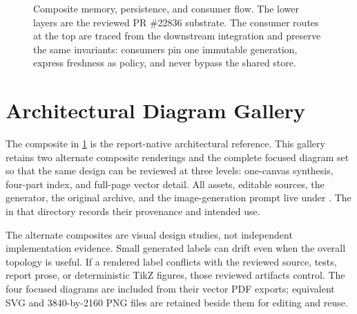 \documentclass[11pt]{article}
\newcommand{\code}[1]{\texttt{\detokenize{#1}}}
\begin{document}
\begin{landscape}
\begin{figure}[p]
{}
\caption{Composite memory, persistence, and consumer flow. The lower layers are the reviewed PR \#22836 substrate. The consumer routes at the top are traced from the downstream \code{dev/refactor} integration and preserve the same invariants: consumers pin one immutable generation, express freshness as policy, and never bypass the shared store.}
\label{fig:cache-composite}
\end{figure}
\end{landscape}
\clearpage

\section{Architectural Diagram Gallery}

The composite in \cref{fig:cache-composite} is the report-native architectural reference. This gallery retains two alternate composite renderings and the complete focused diagram set so that the same design can be reviewed at three levels: one-canvas synthesis, four-part index, and full-page vector detail. All assets, editable sources, the generator, the original archive, and the image-generation prompt live under \code{figures/metadata_cache/}. The \code{README.md} in that directory records their provenance and intended use.

\begin{evidencebox}[title={Rendering and evidence boundary}]
The alternate composites are visual design studies, not independent implementation evidence. Small generated labels can drift even when the overall topology is useful. If a rendered label conflicts with the reviewed source, tests, report prose, or deterministic TikZ figures, those reviewed artifacts control. The four focused diagrams are included from their vector PDF exports; equivalent SVG and 3840-by-2160 PNG files are retained beside them for editing and reuse.
\end{evidencebox}
\end{document}

